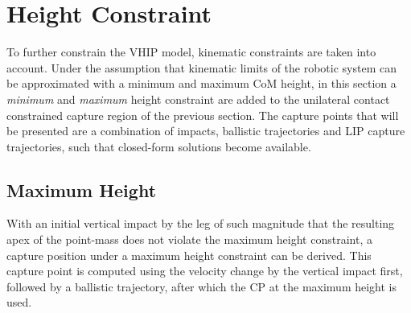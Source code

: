 \section{Height Constraint}
To further constrain the \ac{VHIP} model, kinematic constraints are taken into account. Under the assumption that kinematic limits of the robotic system can be approximated with a minimum and maximum \ac{CoM} height, in this section a \textit{minimum} and \textit{maximum} height constraint are added to the unilateral contact constrained capture region of the previous section. The capture points that will be presented are a combination of impacts, ballistic trajectories and \ac{LIP} capture trajectories, such that closed-form solutions become available. 

\subsection{Maximum Height}
With an initial vertical impact by the leg of such magnitude that the resulting apex of the point-mass does not violate the maximum height constraint, a capture position under a maximum height constraint can be derived. This capture point is computed using the velocity change by the vertical impact first, followed by a ballistic trajectory, after which the \ac{CP} at the maximum height is used.

